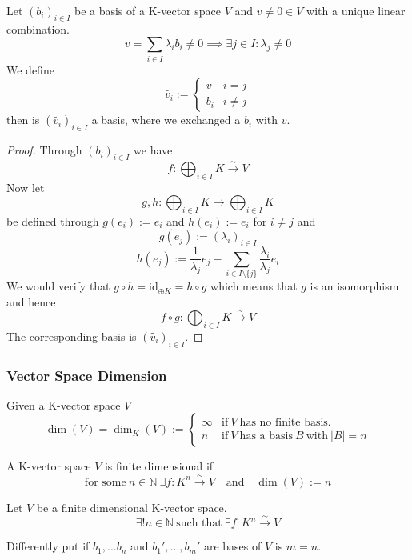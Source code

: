 \begin{lemma}\label{lem:exchange}
   Let \((b_i)_{i \in I}\) be a basis of a K-vector space \(V\) and \(v \neq 0 \in V\) with a unique linear combination.
   \[v = \sum_{i \in I} \lambda_i b_i \neq 0 \implies \exists j \in I: \lambda_j \neq 0\]
   We define
   \[\tilde{v_i} := \begin{cases} v & i = j\\ b_i & i \neq j\end{cases}\]
   then is \((\tilde{v_i})_{i \in I}\) a basis, where we exchanged a \(b_i\) with \(v\).
\end{lemma}
\begin{proof}
   Through \((b_i)_{i \in I}\) we have
   \[f: \bigoplus_{i \in I} K \xrightarrow{\sim} V\]
   Now let
   \[g, h: \bigoplus_{i \in I} K \to \bigoplus_{i \in I} K\]
   be defined through \(g(e_i) := e_i\) and \(h(e_i) := e_i\) for \(i \neq j\) and
   \[g(e_j) := (\lambda_i)_{i \in I}\]
   \[h(e_j) := \frac{1}{\lambda_j} e_j - \sum_{i \in I \setminus \{j\}} \frac{\lambda_i}{\lambda_j} e_i\]
   We would verify that \(g \circ h = \text{id}_{\oplus K} = h \circ g\) which means that \(g\) is an isomorphism and hence
   \[f \circ g: \bigoplus_{i \in I} K \xrightarrow{\sim} V\]
   The corresponding basis is \((\tilde{v_i})_{i \in I}\).
\end{proof}

\subsubsection{Vector Space Dimension}
\begin{definition}
   Given a K-vector space \(V\)
   \[\dim(V) = \dim_{K}(V) := \begin{cases}\infty & \text{if}~V~\text{has no finite basis.}\\n & \text{if}~V~\text{has a basis}~B~\text{with}~|B| = n\end{cases}\]
\end{definition}

\begin{definition}
   A K-vector space \(V\) is finite dimensional if
   \[\text{for some}~n \in \mathbb{N}~\exists f: K^n \xrightarrow{\sim} V \quad\text{and}\quad \dim(V) := n\]
\end{definition}

\begin{proposition}\label{pro:Kn_VS_isomorphism}
   Let \(V\) be a finite dimensional K-vector space.
   \[\exists! n \in \mathbb{N}~\text{such that}~\exists f: K^n \xrightarrow{\sim} V\]
\end{proposition}
\begin{remark}
   Differently put if \(b_1, \ldots b_n\) and \(b_1', \ldots, b_m'\) are bases of \(V\) is \(m = n\).
\end{remark}

